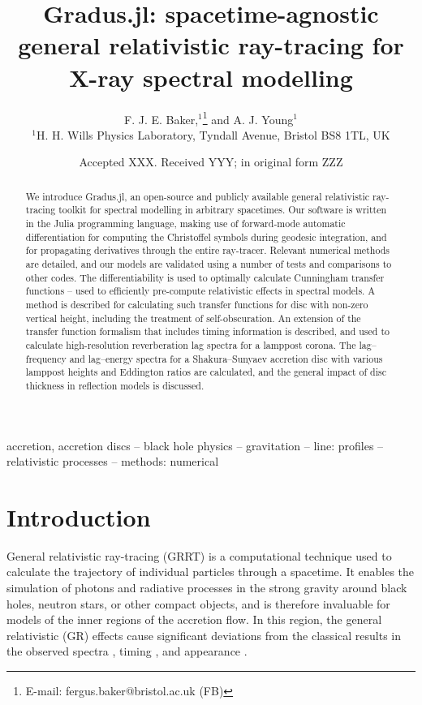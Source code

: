 \documentclass[fleqn,usenatbib]{mnras}
\title[Gradus.jl]{Gradus.jl: spacetime-agnostic general relativistic ray-tracing
for X-ray spectral modelling}
\author[F. J. E. Baker et al.]{
F. J. E. Baker,$^{1}$\thanks{E-mail: fergus.baker@bristol.ac.uk (FB)}
and A. J. Young$^{1}$
\\
$^{1}$H. H. Wills Physics Laboratory, Tyndall Avenue, Bristol BS8 1TL, UK
}
\date{Accepted XXX. Received YYY; in original form ZZZ}
\newcommand{\software}[1]{{\sc #1}}
\newcommand{\Gradus}{\software{Gradus.jl}\xspace}
\begin{document}
\label{firstpage}
\pagerange{\pageref{firstpage}--\pageref{lastpage}}
\maketitle

\begin{abstract}
We introduce \Gradus, an open-source and publicly available general relativistic ray-tracing toolkit for spectral modelling in arbitrary spacetimes. Our software is written in the Julia programming language, making use of forward-mode automatic differentiation for computing the Christoffel symbols during geodesic integration, and for propagating derivatives through the entire ray-tracer. Relevant numerical methods are detailed, and our models are validated using a number of tests and comparisons to other codes. The differentiability is used to optimally calculate Cunningham transfer functions -- used to efficiently pre-compute relativistic effects in spectral models. A method is described for calculating such transfer functions for disc with non-zero vertical height, including the treatment of self-obscuration. An extension of the transfer function formalism that includes timing information is described, and used to calculate high-resolution reverberation lag spectra for a lamppost corona. The lag--frequency and lag--energy spectra for a Shakura--Sunyaev accretion disc with various lamppost heights and Eddington ratios are calculated, and the general impact of disc thickness in reflection models is discussed.
\end{abstract}

\begin{keywords}
accretion, accretion discs -- black hole physics -- gravitation -- line: profiles -- relativistic processes -- methods: numerical
\end{keywords}



\section{Introduction}

General relativistic ray-tracing (GRRT) is a computational technique used to
calculate the trajectory of individual particles through a spacetime.  It
enables the simulation of photons and radiative processes in the
strong gravity around black holes, neutron stars, or other compact objects, and
is therefore invaluable for models of the inner regions of the accretion flow.
In this region, the general relativistic (GR) effects cause significant
deviations from the classical results in the observed spectra
\citep[e.g.][]{cunningham_optical_1973, fabian_long_2002}, timing
\citep[e.g.][]{stella_measuring_1990, reynolds_x-ray_1999}, and appearance
\citep[e.g.][]{luminet_image_1979}.
\end{document}

